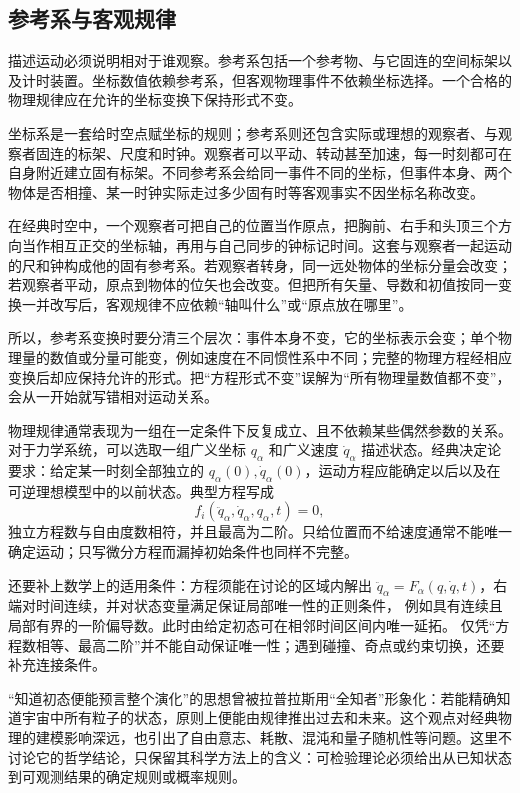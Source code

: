 \subsection{参考系与客观规律}
\label{r2ch01:sec:frame}

描述运动必须说明相对于谁观察。参考系包括一个参考物、与它固连的空间标架以及计时装置。坐标数值依赖参考系，但客观物理事件不依赖坐标选择。一个合格的物理规律应在允许的坐标变换下保持形式不变。

坐标系是一套给时空点赋坐标的规则；参考系则还包含实际或理想的观察者、与观察者固连的标架、尺度和时钟。观察者可以平动、转动甚至加速，每一时刻都可在自身附近建立固有标架。不同参考系会给同一事件不同的坐标，但事件本身、两个物体是否相撞、某一时钟实际走过多少固有时等客观事实不因坐标名称改变。

在经典时空中，一个观察者可把自己的位置当作原点，把胸前、右手和头顶三个方向当作相互正交的坐标轴，再用与自己同步的钟标记时间。这套与观察者一起运动的尺和钟构成他的固有参考系。若观察者转身，同一远处物体的坐标分量会改变；若观察者平动，原点到物体的位矢也会改变。但把所有矢量、导数和初值按同一变换一并改写后，客观规律不应依赖“轴叫什么”或“原点放在哪里”。

所以，参考系变换时要分清三个层次：事件本身不变，它的坐标表示会变；单个物理量的数值或分量可能变，例如速度在不同惯性系中不同；完整的物理方程经相应变换后却应保持允许的形式。把“方程形式不变”误解为“所有物理量数值都不变”，会从一开始就写错相对运动关系。

物理规律通常表现为一组在一定条件下反复成立、且不依赖某些偶然参数的关系。对于力学系统，可以选取一组广义坐标 $q_\alpha$ 和广义速度 $\dot q_\alpha$ 描述状态。经典决定论要求：给定某一时刻全部独立的 $q_\alpha(0),\dot q_\alpha(0)$，运动方程应能确定以后以及在可逆理想模型中的以前状态。典型方程写成
\[
  f_i(\ddot q_\alpha,\dot q_\alpha,q_\alpha,t)=0,
\]
独立方程数与自由度数相符，并且最高为二阶。只给位置而不给速度通常不能唯一确定运动；只写微分方程而漏掉初始条件也同样不完整。

还要补上数学上的适用条件：方程须能在讨论的区域内解出
$\ddot q_\alpha=F_\alpha(q,\dot q,t)$，右端对时间连续，并对状态变量满足保证局部唯一性的正则条件，
例如具有连续且局部有界的一阶偏导数。此时由给定初态可在相邻时间区间内唯一延拓。
仅凭“方程数相等、最高二阶”并不能自动保证唯一性；遇到碰撞、奇点或约束切换，还要补充连接条件。

“知道初态便能预言整个演化”的思想曾被拉普拉斯用“全知者”形象化：若能精确知道宇宙中所有粒子的状态，原则上便能由规律推出过去和未来。这个观点对经典物理的建模影响深远，也引出了自由意志、耗散、混沌和量子随机性等问题。这里不讨论它的哲学结论，只保留其科学方法上的含义：可检验理论必须给出从已知状态到可观测结果的确定规则或概率规则。

